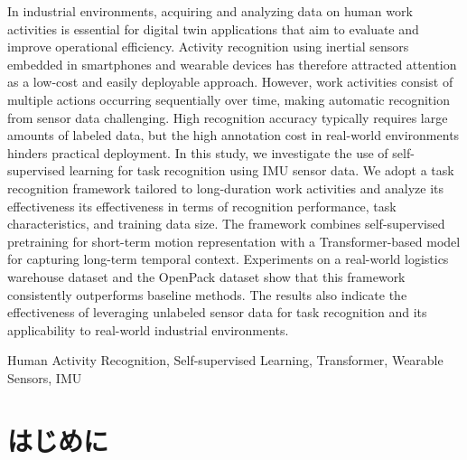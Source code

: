 \documentclass[submit]{ipsj}
\newcommand{\rev}[1]{{\color{red}#1}}
\begin{document}
{\begin{eabstract}
In industrial environments, acquiring and analyzing data on human work activities is essential for digital twin applications that aim to evaluate and improve operational efficiency.
Activity recognition using inertial sensors embedded in smartphones and wearable devices has therefore attracted attention as a low-cost and easily deployable approach.
However, work activities consist of multiple actions occurring sequentially over time, making automatic recognition from sensor data challenging. High recognition accuracy typically requires large amounts of labeled data, but the high annotation cost in real-world environments hinders practical deployment.
\rev{In this study, we investigate the use of self-supervised learning for task recognition using IMU sensor data. We adopt a task recognition framework tailored to long-duration work activities and analyze its effectiveness its effectiveness in terms of recognition performance, task characteristics, and training data size. The framework combines self-supervised pretraining for short-term motion representation with a Transformer-based model for capturing long-term temporal context.}
Experiments on a real-world logistics warehouse dataset and the OpenPack dataset show that {this framework consistently outperforms baseline methods. The results also indicate the effectiveness of leveraging unlabeled sensor data for task recognition and its applicability to real-world industrial environments.}
\end{eabstract}

\begin{ekeyword}
Human Activity Recognition, Self-supervised Learning, Transformer, Wearable Sensors, IMU
\end{ekeyword}

\maketitle

\section{はじめに}

}
\end{document}
